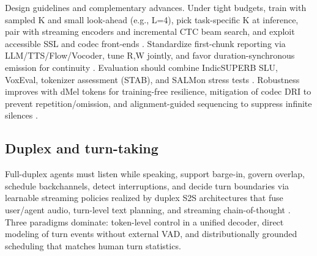 \documentclass{article}
\begin{document}
Design guidelines and complementary advances. Under tight budgets, train with sampled K and small look-ahead (e.g., L=4), pick task-specific K at inference, pair with streaming encoders and incremental CTC beam search, and exploit accessible SSL and codec front-ends \cite{ouyang2025cmusiwslt2025simultaneousspeechtranslati,chen2023reducingbarriersselfsupervisedlearninghu,dhawan2024codecasrtrainingperformantautomaticspeec,sheng2025syncspeechlowlatencyefficientdualstreamt}. Standardize first-chunk reporting via LLM/TTS/Flow/Vocoder, tune R,W jointly, and favor duration-synchronous emission for continuity \cite{fang2025llamaomni2llmbasedrealtimespokenchatbota,sheng2025syncspeechlowlatencyefficientdualstreamt}. Evaluation should combine IndicSUPERB SLU, VoxEval, tokenizer assessment (STAB), and SALMon stress tests \cite{entry2025indicsuperbspeechprocessinguniversalperf,cui2025voxevalbenchmarkingknowledgeunderstandin,vashishth2024stabspeechtokenizerassessmentbenchmark,maimon2025salmonsuiteacousticlanguagemodelevaluati}. Robustness improves with dMel tokens for training-free resilience, mitigation of codec DRI to prevent repetition/omission, and alignment-guided sequencing to suppress infinite silences \cite{bai2025dmelspeechtokenizationmadesimple,liu2024analyzingmitigatinginconsistencydiscrete,li2024investigatingneuralaudiocodecsspeechlang,song2024ellavstableneuralcodeclanguagemodelingal}.



\subsection{Duplex and turn-taking} \label{subsec:Duplex and turn-taking}

Full-duplex agents must listen while speaking, support barge-in, govern overlap, schedule backchannels, detect interruptions, and decide turn boundaries via learnable streaming policies realized by duplex S2S architectures that fuse user/agent audio, turn-level text planning, and streaming chain-of-thought \cite{hu2025salmduplexefficientdirectmodelingspeechl,cui2025thinkbeforeyoutalkenhancingmeaningfuldia,guo2025streamuniachievingstreamingspeechtransla}. Three paradigms dominate: token-level control in a unified decoder, direct modeling of turn events without external VAD, and distributionally grounded scheduling that matches human turn statistics.
\end{document}
